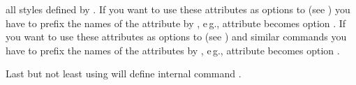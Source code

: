 all styles defined by
. If you want
to use these attributes as options to 
(see ) you have to prefix the names
of the attribute by , e\,g., attribute  becomes
option .
If you want to use these
attributes as options to 
(see ) and similar
commands you have to prefix the names of the attributes by ,
e\,g., attribute  becomes option .

Last but not least using  will define internal
command .

